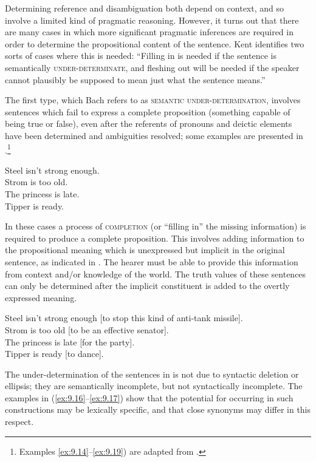Determining reference and disambiguation both depend on context, and so involve a limited kind of pragmatic reasoning. However, it turns out that there are many cases in which more significant pragmatic inferences are required in order to determine the propositional content of the sentence. Kent \citet{Bach1994} identifies two sorts of cases where this is needed: “Filling in is needed if the sentence is semantically \textsc{under-determinate}, and fleshing out will be needed if the speaker cannot plausibly be supposed to mean just what the sentence means.”



The first type, which Bach refers to as \textsc{semantic under-determination}, involves sentences which fail to express a complete proposition (something capable of being true or false), even after the referents of pronouns and deictic elements have been determined and ambiguities resolved; some examples are presented in .\footnote{Examples \ref{ex:9.14}–\ref{ex:9.19}) are adapted from \citet{Bach1994}.}


\ea \label{ex:9.14}
\ea Steel isn’t strong enough.\\
\ex Strom is too old.\\
\ex The princess is late.\\
\ex Tipper is ready.
                       \z
\z


In these cases a process of \textsc{completion} (or “filling in” the missing information) is required to produce a complete proposition. This involves adding information to the propositional meaning which is unexpressed but implicit in the original sentence, as indicated in . The hearer must be able to provide this information from context and/or knowledge of the world. The truth values of these sentences can only be determined after the implicit constituent is added to the overtly expressed meaning.


\ea \label{ex:9.15}
\ea Steel isn’t strong enough [to stop this kind of anti-tank missile].\\
\ex Strom is too old [to be an effective senator].\\
\ex The princess is late [for the party].\\
\ex Tipper is ready [to dance].
                       \z
\z


The under-determination of the sentences in  is not due to syntactic deletion or ellipsis; they are semantically incomplete, but not syntactically incomplete. The examples in (\ref{ex:9.16}--\ref{ex:9.17}) show that the potential for occurring in such constructions may be lexically specific, and that close synonyms may differ in this respect.


